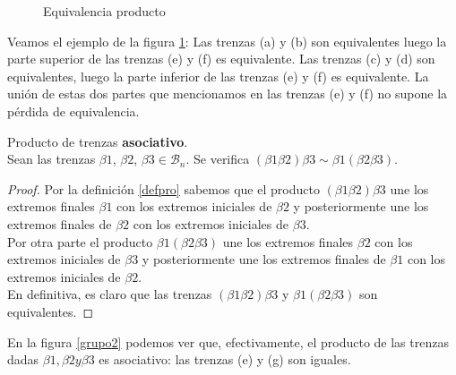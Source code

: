 \begin{figure}[h!]
   	\caption{Equivalencia producto}
   	\label{grupo1} 
   \end{figure}
   
   Veamos el ejemplo de la figura \ref{grupo1}: Las trenzas (a) y (b) son equivalentes luego la parte superior de las trenzas (e) y (f) es equivalente. Las trenzas (c) y (d) son equivalentes, luego la parte inferior de las trenzas (e) y (f) es equivalente. La unión de estas dos partes que mencionamos en las trenzas (e) y (f) no supone la pérdida de equivalencia. \\

\begin{pro} Producto de trenzas \textbf{asociativo}.\label{prodaso}\\
	Sean las trenzas $\beta1$, $\beta2$, $\beta3 \in \mathscr{B}_{n}$. Se verifica $(\beta1 \beta2) \beta3 \sim \beta1 (\beta2 \beta3)$.

	\begin{proof}	
		
		Por la definición \ref{defpro} sabemos que el producto $(\beta1 \beta2) \beta3$ une los extremos finales $ \beta1 $ con los extremos iniciales de $\beta2 $ y posteriormente une los extremos finales de $\beta2 $ con los extremos iniciales de $ \beta3 $. \\
		
		Por otra parte el producto $\beta1 (\beta2 \beta3)$ une los extremos finales $ \beta2 $ con los extremos iniciales de $\beta3 $ y posteriormente une los extremos finales de $\beta1 $ con los extremos iniciales de $ \beta2 $. \\
		
		En definitiva, es claro que las trenzas $(\beta1 \beta2) \beta3 $ y $ \beta1 (\beta2 \beta3)$ son equivalentes.
	\end{proof}
\end{pro}

En la figura \ref{grupo2} podemos ver que, efectivamente, el producto de las trenzas dadas $\beta1, \beta2 y \beta3$ es asociativo: las trenzas (e) y (g) son iguales.\\

